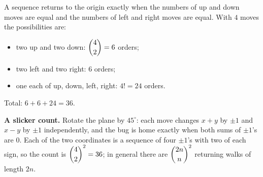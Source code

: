 A sequence returns to the origin exactly when the numbers of up and down moves are equal and the numbers of left and right moves are equal. With $4$ moves the possibilities are:
\begin{itemize}
\item two up and two down: $\dbinom42=6$ orders;
\item two left and two right: $6$ orders;
\item one each of up, down, left, right: $4!=24$ orders.
\end{itemize}
Total: $6+6+24=\boxed{36}$.

\textbf{A slicker count.} Rotate the plane by $45^\circ$: each move changes $x+y$ by $\pm1$ and $x-y$ by $\pm1$ independently, and the bug is home exactly when both sums of $\pm1$'s are $0$. Each of the two coordinates is a sequence of four $\pm1$'s with two of each sign, so the count is $\dbinom42^2=36$; in general there are $\dbinom{2n}{n}^2$ returning walks of length $2n$.
